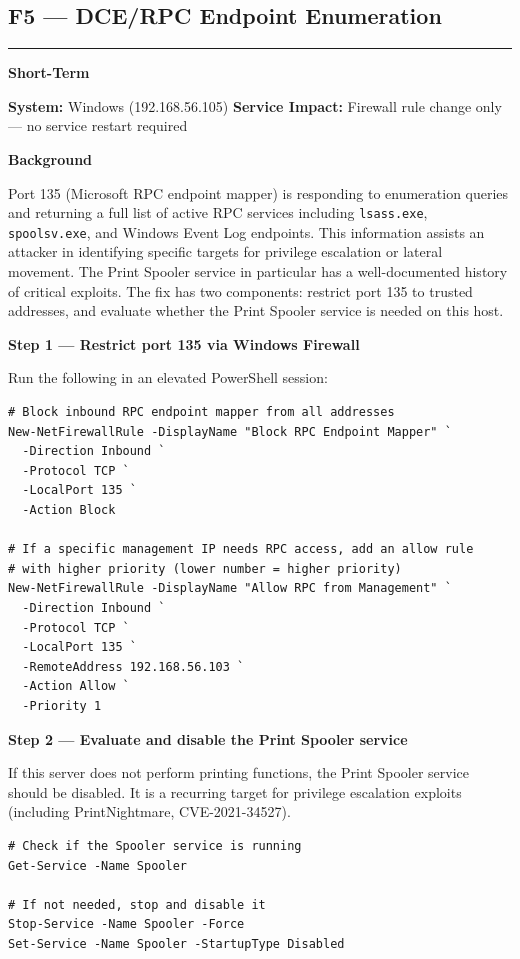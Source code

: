 \documentclass[12pt]{article}
\newcommand{\tfbadge}[2]{%
  \colorbox{#1}{\color{white}\textbf{\small #2}}%
}
\newcommand{\sectionrule}{%
  \vspace{4pt}\noindent\textcolor{headercol}{\rule{\linewidth}{0.8pt}}\vspace{4pt}%
}
\begin{document}
\subsection{F5 --- DCE/RPC Endpoint Enumeration}
\sectionrule
 
\noindent\tfbadge{shortcol}{Short-Term}
\quad\textbf{System:} Windows (192.168.56.105)
\quad\textbf{Service Impact:} Firewall rule change only --- no service restart
required
 
\bigskip
\noindent\textbf{Background}
 
Port 135 (Microsoft RPC endpoint mapper) is responding to enumeration queries
and returning a full list of active RPC services including \texttt{lsass.exe},
\texttt{spoolsv.exe}, and Windows Event Log endpoints. This information assists
an attacker in identifying specific targets for privilege escalation or lateral
movement. The Print Spooler service in particular has a well-documented history
of critical exploits. The fix has two components: restrict port 135 to trusted
addresses, and evaluate whether the Print Spooler service is needed on this
host.
 
\bigskip
\noindent\textbf{Step 1 --- Restrict port 135 via Windows Firewall}
 
Run the following in an elevated PowerShell session:
 
\begin{lstlisting}[style=terminal]
# Block inbound RPC endpoint mapper from all addresses
New-NetFirewallRule -DisplayName "Block RPC Endpoint Mapper" `
  -Direction Inbound `
  -Protocol TCP `
  -LocalPort 135 `
  -Action Block
 
# If a specific management IP needs RPC access, add an allow rule
# with higher priority (lower number = higher priority)
New-NetFirewallRule -DisplayName "Allow RPC from Management" `
  -Direction Inbound `
  -Protocol TCP `
  -LocalPort 135 `
  -RemoteAddress 192.168.56.103 `
  -Action Allow `
  -Priority 1
\end{lstlisting}
 
\bigskip
\noindent\textbf{Step 2 --- Evaluate and disable the Print Spooler service}
 
If this server does not perform printing functions, the Print Spooler service
should be disabled. It is a recurring target for privilege escalation exploits
(including PrintNightmare, CVE-2021-34527).
 
\begin{lstlisting}[style=terminal]
# Check if the Spooler service is running
Get-Service -Name Spooler
 
# If not needed, stop and disable it
Stop-Service -Name Spooler -Force
Set-Service -Name Spooler -StartupType Disabled
\end{lstlisting}
 
\end{document}
